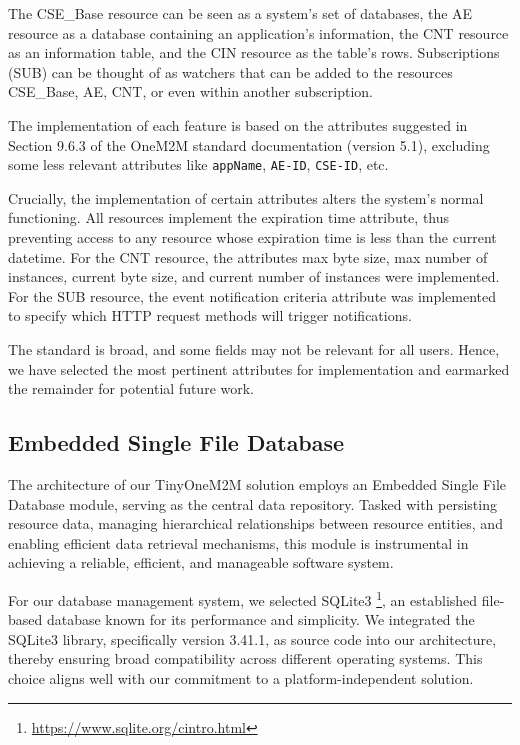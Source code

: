 \documentclass[a4paper,fleqn]{cas-dc}
\begin{document}
The CSE\_Base resource can be seen as a system's set of databases, the AE resource as a database containing an application's information, the CNT resource as an information table, and the CIN resource as the table's rows. Subscriptions (SUB) can be thought of as watchers that can be added to the resources CSE\_Base, AE, CNT, or even within another subscription.

The implementation of each feature is based on the attributes suggested in Section 9.6.3 of the OneM2M standard documentation (version 5.1), excluding some less relevant attributes like \texttt{appName}, \texttt{AE-ID}, \texttt{CSE-ID}, etc.

Crucially, the implementation of certain attributes alters the system's normal functioning. All resources implement the expiration time attribute, thus preventing access to any resource whose expiration time is less than the current datetime. For the CNT resource, the attributes max byte size, max number of instances, current byte size, and current number of instances were implemented. For the SUB resource, the event notification criteria attribute was implemented to specify which HTTP request methods will trigger notifications.

The standard is broad, and some fields may not be relevant for all users. Hence, we have selected the most pertinent attributes for implementation and earmarked the remainder for potential future work.

\subsection{Embedded Single File Database}

The architecture of our TinyOneM2M solution employs an Embedded Single File Database module, serving as the central data repository. Tasked with persisting resource data, managing hierarchical relationships between resource entities, and enabling efficient data retrieval mechanisms, this module is instrumental in achieving a reliable, efficient, and manageable software system.

For our database management system, we selected SQLite3 \footnote{\url{https://www.sqlite.org/cintro.html}}, an established file-based database known for its performance and simplicity. We integrated the SQLite3 library, specifically version 3.41.1, as source code into our architecture, thereby ensuring broad compatibility across different operating systems. This choice aligns well with our commitment to a platform-independent solution.
\end{document}
